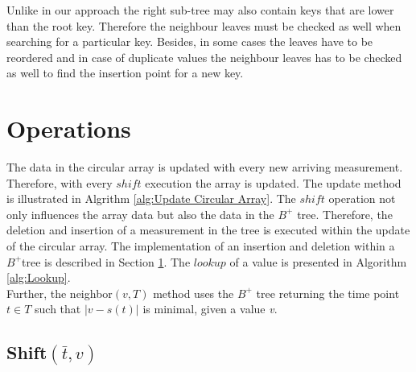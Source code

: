 \documentclass[abstracton,12pt]{scrreprt}
\begin{document}
Unlike in our approach the right sub-tree may also contain keys that are lower than the root key. Therefore the neighbour leaves must be checked as well when searching for a particular key. Besides, in some cases the leaves have to be reordered and in case of duplicate values the neighbour leaves has to be checked as well to find the insertion point for a new key.



\newpage
\section{Operations}
\label{sec:OperationsOnBTree}
The data in the circular array is updated with every new arriving measurement. Therefore, with every $shift$ execution the array is updated. The update method is illustrated in Algrithm \ref{alg:Update Circular Array}. The $shift$ operation not only influences the array data but also the data in the $B^+$ tree. Therefore, the deletion and insertion of a measurement in the tree is executed within the update of the circular array. The implementation of an insertion and deletion within a $B^+$tree is described in Section \ref{sec:OperationsOnBTree}. The $lookup$ of a value is presented in Algorithm \ref{alg:Lookup}.
\\Further, the neighbor$(v,T)$ method uses the $B^+$ tree returning the time point $t \in T$ such that $|v-s(t)|$ is minimal, given a value \emph{v}.

\subsection{Shift$(\bar{t}, v)$}
\end{document}
